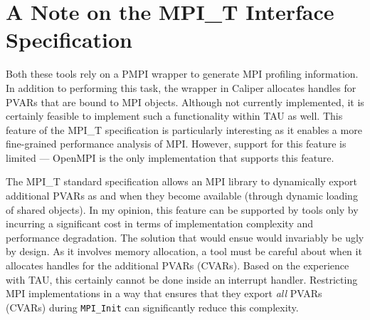 \section{A Note on the MPI\_T Interface Specification}
\par Both these tools rely on a PMPI wrapper to generate MPI profiling information. In addition to performing this task, the wrapper in Caliper allocates handles for PVARs that are bound to MPI objects. Although not currently implemented, it is certainly feasible to implement such a functionality within TAU as well. This feature of the MPI\_T specification is particularly interesting as it enables a more fine-grained performance analysis of MPI. However, support for this feature is limited --- OpenMPI is the only implementation that supports this feature. 
\par The MPI\_T standard specification allows an MPI library to dynamically export additional PVARs as and when they become available (through dynamic loading of shared objects). In my opinion, this feature can be supported by tools only by incurring a significant cost in terms of implementation complexity and performance degradation. The solution that would ensue would invariably be ugly by design. As it involves memory allocation, a tool must be careful about when it allocates handles for the additional PVARs (CVARs). Based on the experience with TAU, this certainly cannot be done inside an interrupt handler. Restricting MPI implementations in a way that ensures that they export \textit{all} PVARs (CVARs) during \verb+MPI_Init+ can significantly reduce this complexity. 

